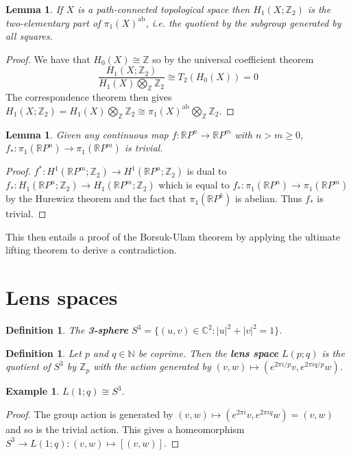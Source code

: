 \documentclass{article}
\newtheorem{definition}[theorem]{Definition}
\newtheorem{lemma}[theorem]{Lemma}
\newtheorem{example}[theorem]{Example}
\begin{document}
\begin{lemma}
If $X$ is a path-connected topological space then $H_1(X;\mathbb{Z}_2)$ is the two-elementary part of $\pi_1(X)^{\text{ab}}$, i.e. the quotient by the subgroup generated by all squares.
\end{lemma}
\begin{proof}
We have that $H_0(X)\cong\mathbb{Z}$ so by the universal coefficient theorem \[\frac{H_1(X;\mathbb{Z}_2)}{H_1(X)\bigotimes_\mathbb{Z}\mathbb{Z}_2}\cong T_2(H_0(X))=0\] The correspondence theorem then gives $H_1(X;\mathbb{Z}_2)=H_1(X)\bigotimes_\mathbb{Z}\mathbb{Z}_2\cong\pi_1(X)^{\text{ab}}\bigotimes_\mathbb{Z}\mathbb{Z}_2$.
\end{proof}

\begin{lemma}
Given any continuous map $f\colon\mathbb{R}P^n\to \mathbb{R}P^m$ with $n>m\geq 0$, $f_*\colon\pi_1(\mathbb{R}P^n)\to \pi_1(\mathbb{R}P^m)$ is trivial.
\end{lemma}
\begin{proof}
 $f^*\colon H^1(\mathbb{R}P^m;\mathbb{Z}_2)\rightarrow H^1(\mathbb{R}P^n;\mathbb{Z}_2)$ is dual to $f_*\colon H_1(\mathbb{R}P^n;\mathbb{Z}_2)\rightarrow H_1(\mathbb{R}P^m;\mathbb{Z}_2)$ which is equal to $f_*\colon \pi_1(\mathbb{R}P^n)\rightarrow \pi_1(\mathbb{R}P^m)$ by the Hurewicz theorem and the fact that $\pi_1(\mathbb{R}P^k)$ is abelian. Thus $f_*$ is trivial.
\end{proof}

\noindent This then entails a proof of the Borsuk-Ulam theorem by applying the ultimate lifting theorem to derive a contradiction.


\section{Lens spaces}
\begin{definition}
The \textbf{3-sphere } $S^3=\{(u,v)\in\mathbb{C}^2:|u|^2+|v|^2=1\}$.
\end{definition}

\begin{definition}
Let $p$ and $q\in\mathbb{N}$ be coprime. Then the \textbf{lens space} $L(p;q)$ is the quotient of $S^3$ by $\mathbb{Z}_p$ with the action generated by $(v,w)\mapsto(e^{2\pi i/p}v,e^{2\pi iq/p}w)$.
\end{definition}

\begin{example}
$L(1;q)\cong S^3$.
\end{example}
\begin{proof}
The group action is generated by $(v,w)\mapsto(e^{2\pi i}v,e^{2\pi iq}w)=(v,w)$ and so is the trivial action. This gives a homeomorphism $S^3\to L(1;q):(v,w)\mapsto[(v,w)]$.
\end{proof}
\end{document}
